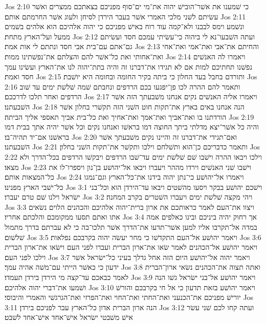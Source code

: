 Jos 2:10  כי שׁמענו את אשׁר־הובישׁ יהוה את־מי ים־סוף מפניכם בצאתכם ממצרים ואשׁר עשׂיתם לשׁני מלכי האמרי אשׁר בעבר הירדן לסיחן ולעוג אשׁר החרמתם אותם׃
Jos 2:11  ונשׁמע וימס לבבנו ולא־קמה עוד רוח באישׁ מפניכם כי יהוה אלהיכם הוא אלהים בשׁמים ממעל ועל־הארץ מתחת׃
Jos 2:12  ועתה השׁבעו־נא לי ביהוה כי־עשׂיתי עמכם חסד ועשׂיתם גם־אתם עם־בית אבי חסד ונתתם לי אות אמת׃
Jos 2:13  והחיתם את־אבי ואת־אמי ואת־אחי ואת־אחותי ואת כל־אשׁר להם והצלתם את־נפשׁתינו ממות׃
Jos 2:14  ויאמרו לה האנשׁים נפשׁנו תחתיכם למות אם לא תגידו את־דברנו זה והיה בתת־יהוה לנו את־הארץ ועשׂינו עמך חסד ואמת׃
Jos 2:15  ותורדם בחבל בעד החלון כי ביתה בקיר החומה ובחומה היא יושׁבת׃
Jos 2:16  ותאמר להם ההרה לכו פן־יפגעו בכם הרדפים ונחבתם שׁמה שׁלשׁת ימים עד שׁוב הרדפים ואחר תלכו לדרככם׃
Jos 2:17  ויאמרו אליה האנשׁים נקים אנחנו משׁבעתך הזה אשׁר השׁבעתנו׃
Jos 2:18  הנה אנחנו באים בארץ את־תקות חוט השׁני הזה תקשׁרי בחלון אשׁר הורדתנו בו ואת־אביך ואת־אמך ואת־אחיך ואת כל־בית אביך תאספי אליך הביתה׃
Jos 2:19  והיה כל אשׁר־יצא מדלתי ביתך החוצה דמו בראשׁו ואנחנו נקים וכל אשׁר יהיה אתך בבית דמו בראשׁנו אם־יד תהיה־בו׃
Jos 2:20  ואם־תגידי את־דברנו זה והיינו נקים משׁבעתך אשׁר השׁבעתנו׃
Jos 2:21  ותאמר כדבריכם כן־הוא ותשׁלחם וילכו ותקשׁר את־תקות השׁני בחלון׃
Jos 2:22  וילכו ויבאו ההרה וישׁבו שׁם שׁלשׁת ימים עד־שׁבו הרדפים ויבקשׁו הרדפים בכל־הדרך ולא מצאו׃
Jos 2:23  וישׁבו שׁני האנשׁים וירדו מההר ויעברו ויבאו אל־יהושׁע בן־נון ויספרו־לו את כל־המצאות אותם׃
Jos 2:24  ויאמרו אל־יהושׁע כי־נתן יהוה בידנו את־כל־הארץ וגם־נמגו כל־ישׁבי הארץ מפנינו׃
Jos 3:1  וישׁכם יהושׁע בבקר ויסעו מהשׁטים ויבאו עד־הירדן הוא וכל־בני ישׂראל וילנו שׁם טרם יעברו׃
Jos 3:2  ויהי מקצה שׁלשׁת ימים ויעברו השׁטרים בקרב המחנה׃
Jos 3:3  ויצוו את־העם לאמר כראותכם את ארון ברית־יהוה אלהיכם והכהנים הלוים נשׂאים אתו ואתם תסעו ממקומכם והלכתם אחריו׃
Jos 3:4  אך רחוק יהיה ביניכם ובינו כאלפים אמה במדה אל־תקרבו אליו למען אשׁר־תדעו את־הדרך אשׁר תלכו־בה כי לא עברתם בדרך מתמול שׁלשׁום׃
Jos 3:5  ויאמר יהושׁע אל־העם התקדשׁו כי מחר יעשׂה יהוה בקרבכם נפלאות׃
Jos 3:6  ויאמר יהושׁע אל־הכהנים לאמר שׂאו את־ארון הברית ועברו לפני העם וישׂאו את־ארון הברית וילכו לפני העם׃
Jos 3:7  ויאמר יהוה אל־יהושׁע היום הזה אחל גדלך בעיני כל־ישׂראל אשׁר ידעון כי כאשׁר הייתי עם־משׁה אהיה עמך׃
Jos 3:8  ואתה תצוה את־הכהנים נשׂאי ארון־הברית לאמר כבאכם עד־קצה מי הירדן בירדן תעמדו׃
Jos 3:9  ויאמר יהושׁע אל־בני ישׂראל גשׁו הנה ושׁמעו את־דברי יהוה אלהיכם׃
Jos 3:10  ויאמר יהושׁע בזאת תדעון כי אל חי בקרבכם והורשׁ יורישׁ מפניכם את־הכנעני ואת־החתי ואת־החוי ואת־הפרזי ואת־הגרגשׁי והאמרי והיבוסי׃
Jos 3:11  הנה ארון הברית אדון כל־הארץ עבר לפניכם בירדן׃
Jos 3:12  ועתה קחו לכם שׁני עשׂר אישׁ משׁבטי ישׂראל אישׁ־אחד אישׁ־אחד לשׁבט׃

